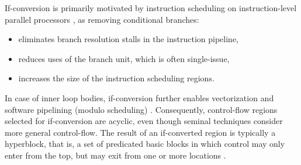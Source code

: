 If-conversion is primarily motivated by instruction scheduling on
instruction-level parallel processors \cite{Mahlke:1995:ISCA}, as removing
conditional branches: \begin{itemize} \item eliminates branch resolution stalls
in the instruction pipeline, \item reduces uses of the branch unit, which is
often single-issue, \item increases the size of the instruction scheduling
regions.  \end{itemize} In case of inner loop bodies, if-conversion further
enables vectorization \cite{Allen:1983:POPL} and software pipelining (modulo
scheduling) \cite{Park:1991:TR58}. Consequently, control-flow regions selected
for if-conversion are acyclic, even though seminal techniques
\cite{Allen:1983:POPL, Park:1991:TR58} consider more general control-flow.
The result of an if-converted region is typically a hyperblock, that is, a set
of predicated basic blocks in which control may only enter from the top, but may
exit from one or more locations \cite{Mahlke:1992:MICRO}.
\medskip


